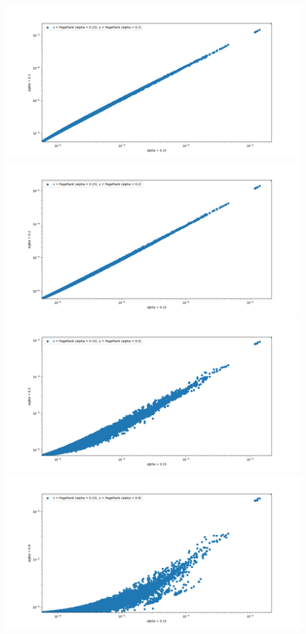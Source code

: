 \documentclass{report}
\begin{document}
\begin{center}
  \includegraphics[width=0.25\paperwidth]{assets/pagerank01.png}
  \includegraphics[width=0.25\paperwidth]{assets/pagerank02.png}
  \includegraphics[width=0.25\paperwidth]{assets/pagerank05.png}
  \includegraphics[width=0.25\paperwidth]{assets/pagerank09.png}
\end{center}
\end{document}
